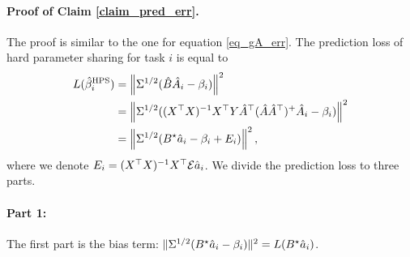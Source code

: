 	\paragraph{Proof of Claim \ref{claim_pred_err}.}
	The proof is similar to the one for equation \eqref{eq_gA_err}. 
	The prediction loss of hard parameter sharing for task $i$ is equal to
	\begin{align*}
		L(\hat{\beta}_i^{\textup{HPS}}) &= \left\| \Sigma^{1/2} (\hat{B} \hat{A}_i - \beta_i) \right\|^2 \\
		&= \left\| \Sigma^{1/2} ((X^{\top} X)^{-1} X^{\top} Y \hat{A}^{\top} (\hat{A} \hat{A}^{\top})^{+} \hat{A}_i - \beta_i) \right\|^2 \\
		&= \left\| \Sigma^{1/2} (B^{\star} \hat{a}_i - \beta_i + E_i) \right\|^2,
	\end{align*}
	where we denote $E_i = (X^{\top} X)^{-1} X^{\top} \mathcal{E} \hat{a}_i$.
	We divide the prediction loss to three parts.

	\paragraph{Part 1:} The first part is the bias term:
	$\|\Sigma^{1/2} (B^{\star} \hat{a}_i - \beta_i)\|^2 = L(B^{\star} \hat{a}_i)$.

